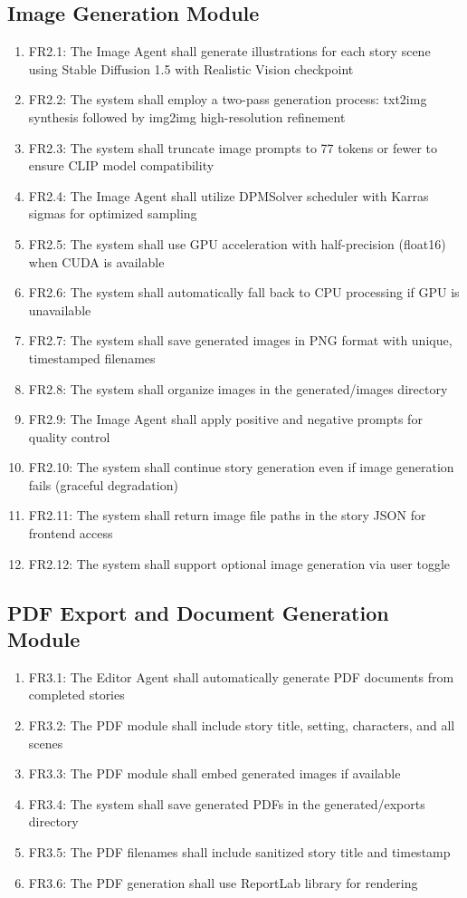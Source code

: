 \subsection{Image Generation Module}

\begin{enumerate}
    \item FR2.1: The Image Agent shall generate illustrations for each story scene using Stable Diffusion 1.5 with Realistic Vision checkpoint
    \item FR2.2: The system shall employ a two-pass generation process: txt2img synthesis followed by img2img high-resolution refinement
    \item FR2.3: The system shall truncate image prompts to 77 tokens or fewer to ensure CLIP model compatibility
    \item FR2.4: The Image Agent shall utilize DPMSolver scheduler with Karras sigmas for optimized sampling
    \item FR2.5: The system shall use GPU acceleration with half-precision (float16) when CUDA is available
    \item FR2.6: The system shall automatically fall back to CPU processing if GPU is unavailable
    \item FR2.7: The system shall save generated images in PNG format with unique, timestamped filenames
    \item FR2.8: The system shall organize images in the generated/images directory
    \item FR2.9: The Image Agent shall apply positive and negative prompts for quality control
    \item FR2.10: The system shall continue story generation even if image generation fails (graceful degradation)
    \item FR2.11: The system shall return image file paths in the story JSON for frontend access
    \item FR2.12: The system shall support optional image generation via user toggle
\end{enumerate}

\subsection{PDF Export and Document Generation Module}

\begin{enumerate}
    \item FR3.1: The Editor Agent shall automatically generate PDF documents from completed stories
    \item FR3.2: The PDF module shall include story title, setting, characters, and all scenes
    \item FR3.3: The PDF module shall embed generated images if available
    \item FR3.4: The system shall save generated PDFs in the generated/exports directory
    \item FR3.5: The PDF filenames shall include sanitized story title and timestamp
    \item FR3.6: The PDF generation shall use ReportLab library for rendering
\end{enumerate}

